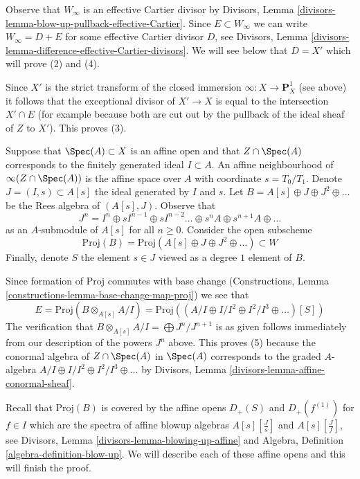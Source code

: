 \medskip\noindent
Observe that $W_\infty$ is an effective Cartier divisor by
Divisors, Lemma \ref{divisors-lemma-blow-up-pullback-effective-Cartier}.
Since $E \subset W_\infty$ we can write $W_\infty = D + E$ for some
effective Cartier divisor $D$, see
Divisors, Lemma \ref{divisors-lemma-difference-effective-Cartier-divisors}.
We will see below that $D = X'$ which will prove (2) and (4).

\medskip\noindent
Since $X'$ is the strict transform of the closed immersion
$\infty : X \to \mathbf{P}^1_X$ (see above) it follows that the exceptional
divisor of $X' \to X$ is equal to the intersection $X' \cap E$
(for example because both are cut out by the pullback of the
ideal sheaf of $Z$ to $X'$). This proves (3).

\medskip\noindent
Suppose that $\Spec(A) \subset X$ is an affine open and that $Z \cap \Spec(A)$
corresponds to the finitely generated ideal $I \subset A$.
An affine neighbourhood of $\infty(Z \cap \Spec(A))$ is the
affine space over $A$ with coordinate $s = T_0/T_1$. Denote
$J = (I, s) \subset A[s]$ the ideal generated by $I$ and $s$.
Let $B = A[s] \oplus J \oplus J^2 \oplus \ldots$ be the Rees algebra
of $(A[s], J)$. Observe that
$$
J^n =
I^n \oplus sI^{n - 1} \oplus sI^{n - 2} \ldots \oplus s^nA
\oplus s^{n + 1}A \oplus \ldots
$$
as an $A$-submodule of $A[s]$ for all $n \geq 0$. Consider the open subscheme
$$
\text{Proj}(B) = \text{Proj}(A[s] \oplus J \oplus J^2 \oplus \ldots)
\subset W
$$
Finally, denote $S$ the element $s \in J$ viewed as a degree $1$ element
of $B$.

\medskip\noindent
Since formation of $\text{Proj}$ commutes with base change
(Constructions, Lemma \ref{constructions-lemma-base-change-map-proj})
we see that
$$
E = \text{Proj}(B \otimes_{A[s]} A/I) =
\text{Proj}((A/I \oplus I/I^2 \oplus I^2/I^3 \oplus \ldots)[S])
$$
The verification that $B \otimes_{A[s]} A/I = \bigoplus J^n/J^{n + 1}$
is as given
follows immediately from our description of the powers $J^n$ above.
This proves (5) because the conormal algebra of $Z \cap \Spec(A)$
in $\Spec(A)$ corresponds to the graded $A$-algebra
$A/I \oplus I/I^2 \oplus I^2/I^3 \oplus \ldots$ by
Divisors, Lemma \ref{divisors-lemma-affine-conormal-sheaf}.

\medskip\noindent
Recall that $\text{Proj}(B)$ is covered by the affine opens
$D_+(S)$ and $D_+(f^{(1)})$ for $f \in I$ which are
the spectra of affine blowup algebras $A[s][\frac{J}{s}]$
and $A[s][\frac{J}{f}]$, see
Divisors, Lemma \ref{divisors-lemma-blowing-up-affine} and
Algebra, Definition \ref{algebra-definition-blow-up}.
We will describe each of these affine opens and this will finish the
proof.

